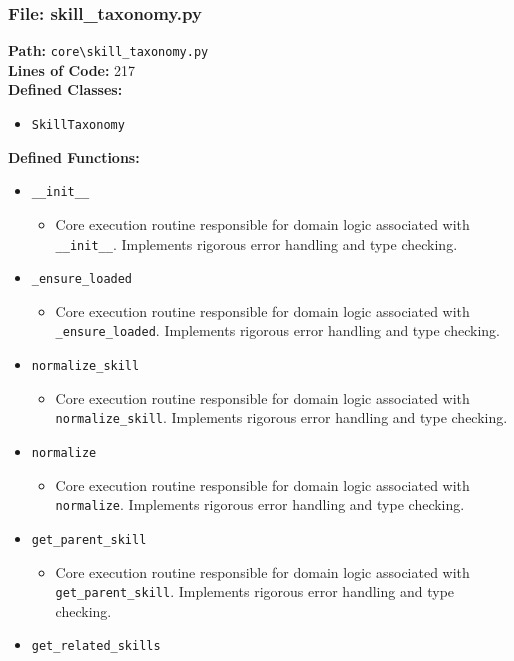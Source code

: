 \documentclass[10pt,journal,compsoc]{IEEEtran}
\begin{document}
\subsubsection{File: skill\_taxonomy.py}
\textbf{Path:} \texttt{core\textbackslash{}skill\_taxonomy.py} \\
\textbf{Lines of Code:} 217 \\
\textbf{Defined Classes:}
\begin{itemize}
    \item \texttt{SkillTaxonomy}
\end{itemize}
\textbf{Defined Functions:}
\begin{itemize}
    \item \texttt{\_\_init\_\_}
    \begin{itemize} \item Core execution routine responsible for domain logic associated with \texttt{\_\_init\_\_}. Implements rigorous error handling and type checking. \end{itemize}
    \item \texttt{\_ensure\_loaded}
    \begin{itemize} \item Core execution routine responsible for domain logic associated with \texttt{\_ensure\_loaded}. Implements rigorous error handling and type checking. \end{itemize}
    \item \texttt{normalize\_skill}
    \begin{itemize} \item Core execution routine responsible for domain logic associated with \texttt{normalize\_skill}. Implements rigorous error handling and type checking. \end{itemize}
    \item \texttt{normalize}
    \begin{itemize} \item Core execution routine responsible for domain logic associated with \texttt{normalize}. Implements rigorous error handling and type checking. \end{itemize}
    \item \texttt{get\_parent\_skill}
    \begin{itemize} \item Core execution routine responsible for domain logic associated with \texttt{get\_parent\_skill}. Implements rigorous error handling and type checking. \end{itemize}
    \item \texttt{get\_related\_skills}

\end{itemize}
\end{document}
